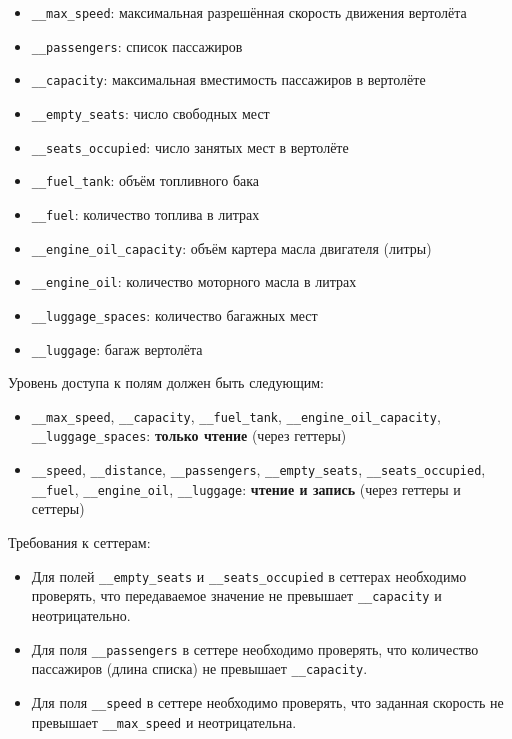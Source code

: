 \begin{enumerate}
\begin{itemize}
    \item \texttt{\_\_max\_speed}: максимальная разрешённая скорость движения вертолёта  
    \item \texttt{\_\_passengers}: список пассажиров  
    \item \texttt{\_\_capacity}: максимальная вместимость пассажиров в вертолёте  
    \item \texttt{\_\_empty\_seats}: число свободных мест  
    \item \texttt{\_\_seats\_occupied}: число занятых мест в вертолёте  
    \item \texttt{\_\_fuel\_tank}: объём топливного бака  
    \item \texttt{\_\_fuel}: количество топлива в литрах  
    \item \texttt{\_\_engine\_oil\_capacity}: объём картера масла двигателя (литры)  
    \item \texttt{\_\_engine\_oil}: количество моторного масла в литрах  
    \item \texttt{\_\_luggage\_spaces}: количество багажных мест  
    \item \texttt{\_\_luggage}: багаж вертолёта  
\end{itemize}
Уровень доступа к полям должен быть следующим:
\begin{itemize}
    \item \texttt{\_\_max\_speed}, \texttt{\_\_capacity}, \texttt{\_\_fuel\_tank}, \texttt{\_\_engine\_oil\_capacity}, \texttt{\_\_luggage\_spaces}: \textbf{только чтение} (через геттеры)  
    \item \texttt{\_\_speed}, \texttt{\_\_distance}, \texttt{\_\_passengers}, \texttt{\_\_empty\_seats}, \texttt{\_\_seats\_occupied}, \texttt{\_\_fuel}, \texttt{\_\_engine\_oil}, \texttt{\_\_luggage}: \textbf{чтение и запись} (через геттеры и сеттеры)
\end{itemize}
Требования к сеттерам:
\begin{itemize}
    \item Для полей \texttt{\_\_empty\_seats} и \texttt{\_\_seats\_occupied} в сеттерах необходимо проверять, что передаваемое значение не превышает \texttt{\_\_capacity} и неотрицательно.  
    \item Для поля \texttt{\_\_passengers} в сеттере необходимо проверять, что количество пассажиров (длина списка) не превышает \texttt{\_\_capacity}.  
    \item Для поля \texttt{\_\_speed} в сеттере необходимо проверять, что заданная скорость не превышает \texttt{\_\_max\_speed} и неотрицательна.  

\end{itemize}
\end{enumerate}
